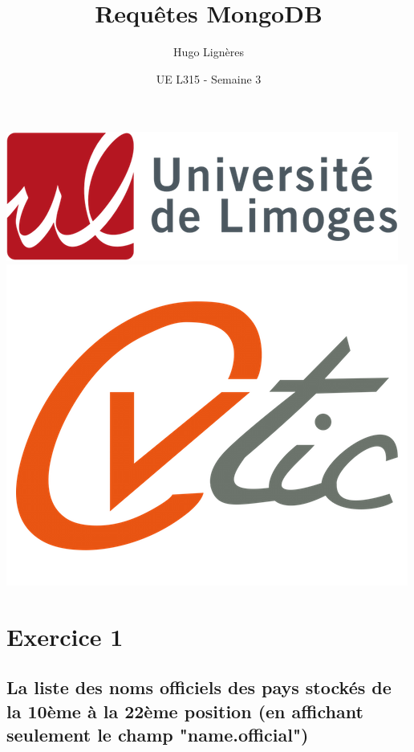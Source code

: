 \documentclass[12pt,a4paper]{article}
\title{Requêtes MongoDB}
\author{Hugo Lignères}
\date{UE L315 - Semaine 3}
\begin{document}
\maketitle

\hrulefill
\vspace{6cm}
\begin{center}
	\includegraphics[scale=.4]{../images/univ.png}
		\\
		\vspace{2cm}
	\includegraphics[scale=.25]{../images/cvtic.png}
\end{center}

\newpage

\tableofcontents

\newpage

\section{Exercice 1}

\subsection{La liste des noms officiels des pays stockés de la 10ème à la 22ème position (en affichant seulement le champ "name.official")}
\end{document}
